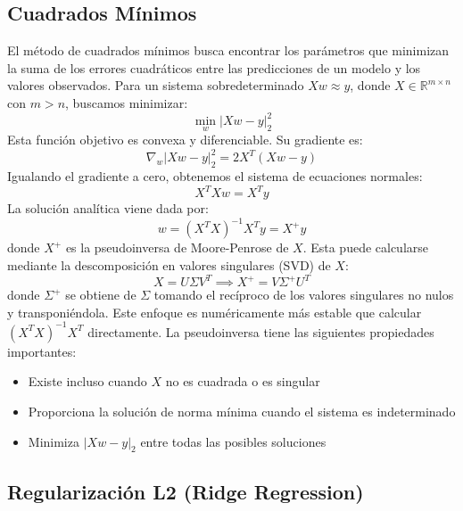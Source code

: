 \documentclass{tp02}
\begin{document}
\subsection{Cuadrados Mínimos}

El método de cuadrados mínimos busca encontrar los parámetros que minimizan la suma
de los errores cuadráticos entre las predicciones de un modelo y los valores
observados. Para un sistema sobredeterminado $Xw \approx y$, donde $X \in \mathbb{R}^{m\times n}$
con $m > n$, buscamos minimizar:
\begin{equation}
\min_w |Xw - y|_2^2
\end{equation}
Esta función objetivo es convexa y diferenciable. Su gradiente es:
\begin{equation}
\nabla_w|Xw - y|_2^2 = 2X^T(Xw - y)
\end{equation}
Igualando el gradiente a cero, obtenemos el sistema de ecuaciones normales:
\begin{equation}
X^TXw = X^Ty
\end{equation}
La solución analítica viene dada por:
\begin{equation}
w = (X^TX)^{-1}X^Ty = X^+y
\end{equation}
donde $X^+$ es la pseudoinversa de Moore-Penrose de $X$. Esta puede calcularse
mediante la descomposición en valores singulares (SVD) de $X$:
\begin{equation}
X = U\Sigma V^T \implies X^+ = V\Sigma^+U^T
\end{equation}
donde $\Sigma^+$ se obtiene de $\Sigma$ tomando el recíproco de los valores
singulares no nulos y transponiéndola. Este enfoque es numéricamente más estable que
calcular $(X^TX)^{-1}X^T$ directamente.
La pseudoinversa tiene las siguientes propiedades importantes:
\begin{itemize}
\item Existe incluso cuando $X$ no es cuadrada o es singular
\item Proporciona la solución de norma mínima cuando el sistema es indeterminado
\item Minimiza $|Xw - y|_2$ entre todas las posibles soluciones
\end{itemize}



\subsection{Regularización L2 (Ridge Regression)}
\end{document}
